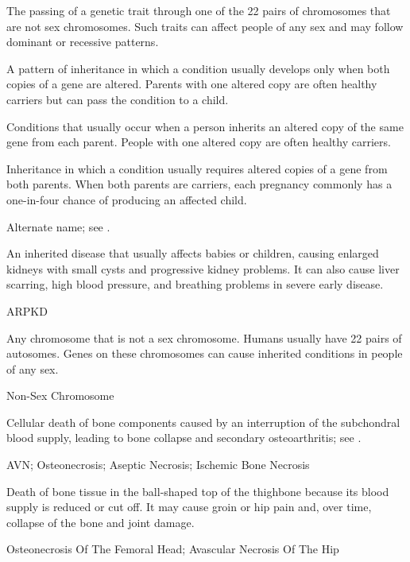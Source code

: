  The passing of a genetic trait through one of the 22 pairs of chromosomes that are not sex chromosomes. Such traits can affect people of any sex and may follow dominant or recessive patterns.

 A pattern of inheritance in which a condition usually develops only when both copies of a gene are altered. Parents with one altered copy are often healthy carriers but can pass the condition to a child.

 Conditions that usually occur when a person inherits an altered copy of the same gene from each parent. People with one altered copy are often healthy carriers.

 Inheritance in which a condition usually requires altered copies of a gene from both parents. When both parents are carriers, each pregnancy commonly has a one-in-four chance of producing an affected child.

 Alternate name; see .

 An inherited disease that usually affects babies or children, causing enlarged kidneys with small cysts and progressive kidney problems. It can also cause liver scarring, high blood pressure, and breathing problems in severe early disease.

\synonyms
ARPKD

 Any chromosome that is not a sex chromosome. Humans usually have 22 pairs of autosomes. Genes on these chromosomes can cause inherited conditions in people of any sex.

\synonyms
Non-Sex Chromosome

 Cellular death of bone components caused by an interruption of the subchondral blood supply, leading to bone collapse and secondary osteoarthritis; see .

\synonyms
AVN; Osteonecrosis; Aseptic Necrosis; Ischemic Bone Necrosis

 Death of bone tissue in the ball-shaped top of the thighbone because its blood supply is reduced or cut off. It may cause groin or hip pain and, over time, collapse of the bone and joint damage.

\synonyms
Osteonecrosis Of The Femoral Head; Avascular Necrosis Of The Hip


